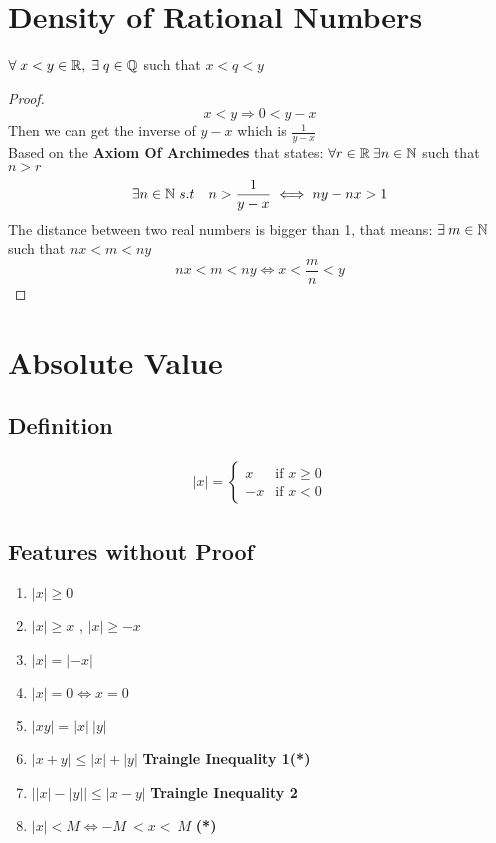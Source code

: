 \section{Density of Rational Numbers}
$\forall\; x<y\in \mathbb{R}, \; \exists\; q\in \mathbb{Q}$ such that $x<q<y$\\ 

\begin{proof}
    \[
        x<y \Longrightarrow 0 < y-x 
    \]
    Then we can get the inverse of $y-x$ which is $\frac{1}{y-x}$\\
    Based on the \textbf{Axiom Of Archimedes} that states: $\forall r\in \mathbb{R}\: \exists n\in \mathbb{N}$ such that $n>r$\\
    \[
        \exists n\in \mathbb{N}\; s.t \quad n>\frac{1}{y-x} \iff ny-nx>1
    \]
    The distance between two real numbers is bigger than 1, that means: $\exists \: m\in \mathbb{N}$ such that $nx<m<ny$\\
    \[
        nx<m<ny \iff x<\frac{m}{n}<y
    \]
\end{proof}

\section{Absolute Value}
\subsection{Definition}
\begin{align*}
    |x| = \left\{
    \begin{array}{ll}
    x & \text{if } x \geq 0 \\
    -x & \text{if } x < 0
    \end{array}
    \right.
\end{align*}

\newpage
\subsection{Features without Proof}
\begin{enumerate}
    \item $|x|\geq 0$
    \item $|x| \geq x$ , $|x| \geq -x$
    \item $|x| = |-x|$
    \item $|x| = 0 \iff x = 0$
    \item $|xy| = |x|\:|y|$
    \item $|x+y|\leq |x|+|y|$ \textbf{Traingle Inequality 1(*)}
    \item $\Big| |x| - |y| \Big| \leq \Big| x - y \Big|$ \textbf{Traingle Inequality 2}
    \item \label{abs:open-abs}$|x| < M \iff -M\: <x<\: M$ \textbf{(*)}
\end{enumerate}

